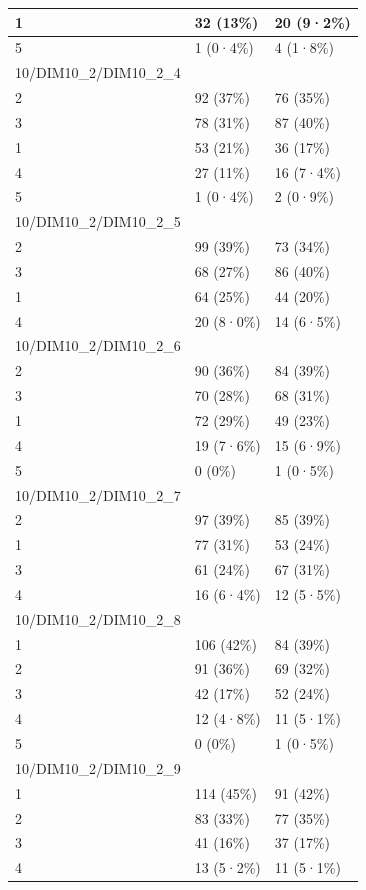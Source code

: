 \documentclass[
]{book}
\begin{document}
\begin{tabular}{l|l|l}
\hline
1 & 32 (13\%) & 20 (9·2\%)\\
\hline
5 & 1 (0·4\%) & 4 (1·8\%)\\
\hline
10/DIM10\_2/DIM10\_2\_4 &  & \\
\hline
2 & 92 (37\%) & 76 (35\%)\\
\hline
3 & 78 (31\%) & 87 (40\%)\\
\hline
1 & 53 (21\%) & 36 (17\%)\\
\hline
4 & 27 (11\%) & 16 (7·4\%)\\
\hline
5 & 1 (0·4\%) & 2 (0·9\%)\\
\hline
10/DIM10\_2/DIM10\_2\_5 &  & \\
\hline
2 & 99 (39\%) & 73 (34\%)\\
\hline
3 & 68 (27\%) & 86 (40\%)\\
\hline
1 & 64 (25\%) & 44 (20\%)\\
\hline
4 & 20 (8·0\%) & 14 (6·5\%)\\
\hline
10/DIM10\_2/DIM10\_2\_6 &  & \\
\hline
2 & 90 (36\%) & 84 (39\%)\\
\hline
3 & 70 (28\%) & 68 (31\%)\\
\hline
1 & 72 (29\%) & 49 (23\%)\\
\hline
4 & 19 (7·6\%) & 15 (6·9\%)\\
\hline
5 & 0 (0\%) & 1 (0·5\%)\\
\hline
10/DIM10\_2/DIM10\_2\_7 &  & \\
\hline
2 & 97 (39\%) & 85 (39\%)\\
\hline
1 & 77 (31\%) & 53 (24\%)\\
\hline
3 & 61 (24\%) & 67 (31\%)\\
\hline
4 & 16 (6·4\%) & 12 (5·5\%)\\
\hline
10/DIM10\_2/DIM10\_2\_8 &  & \\
\hline
1 & 106 (42\%) & 84 (39\%)\\
\hline
2 & 91 (36\%) & 69 (32\%)\\
\hline
3 & 42 (17\%) & 52 (24\%)\\
\hline
4 & 12 (4·8\%) & 11 (5·1\%)\\
\hline
5 & 0 (0\%) & 1 (0·5\%)\\
\hline
10/DIM10\_2/DIM10\_2\_9 &  & \\
\hline
1 & 114 (45\%) & 91 (42\%)\\
\hline
2 & 83 (33\%) & 77 (35\%)\\
\hline
3 & 41 (16\%) & 37 (17\%)\\
\hline
4 & 13 (5·2\%) & 11 (5·1\%)\\

\end{tabular}
\end{document}
